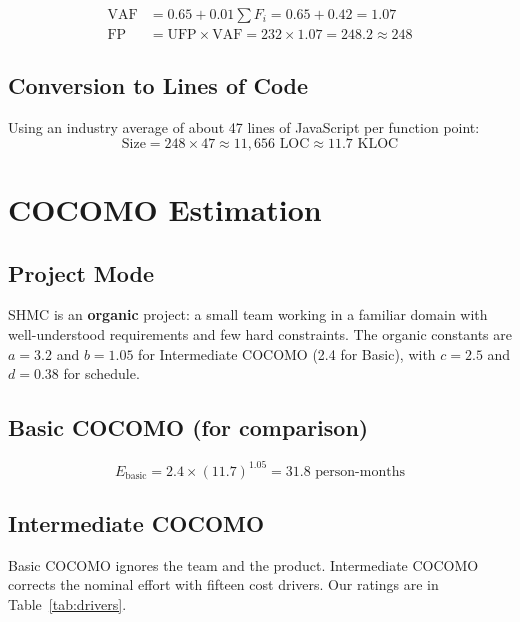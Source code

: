 \documentclass[11pt,a4paper]{report}
\begin{document}
\begin{align*}
\text{VAF} &= 0.65 + 0.01 \sum F_i = 0.65 + 0.42 = 1.07\\
\text{FP} &= \text{UFP} \times \text{VAF} = 232 \times 1.07 = 248.2 \approx 248
\end{align*}

\subsection{Conversion to Lines of Code}
Using an industry average of about 47 lines of JavaScript per function point:
\[
\text{Size} = 248 \times 47 \approx 11{,}656 \text{ LOC} \approx 11.7 \text{ KLOC}
\]

\section{COCOMO Estimation}\label{sec:cocomo}
\subsection{Project Mode}
SHMC is an \textbf{organic} project: a small team working in a familiar domain with well-understood requirements and few hard constraints. The organic constants are $a = 3.2$ and $b = 1.05$ for Intermediate COCOMO (2.4 for Basic), with $c = 2.5$ and $d = 0.38$ for schedule.

\subsection{Basic COCOMO (for comparison)}
\[
E_{\text{basic}} = 2.4 \times (11.7)^{1.05} = 31.8 \text{ person-months}
\]

\subsection{Intermediate COCOMO}
Basic COCOMO ignores the team and the product. Intermediate COCOMO corrects the nominal effort with fifteen cost drivers. Our ratings are in Table~\ref{tab:drivers}.
\end{document}
